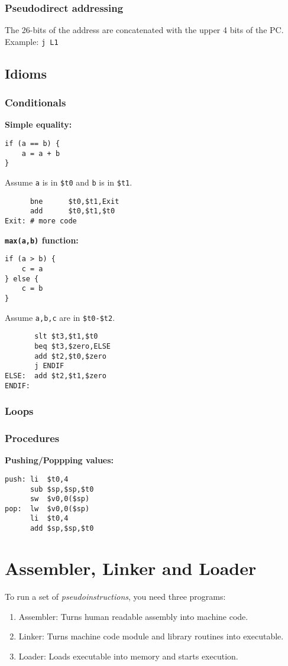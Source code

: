 \documentclass{article}
\theoremstyle{sltheorem}
\newcommand*\B[1]{\textbf{#1}}
\newcommand*\T[1]{\texttt{#1}}
\begin{document}
\subsubsection{Pseudodirect addressing}
The 26-bits of the address are concatenated with the upper 4 bits of the PC.\\
Example: \T{j L1}
\subsection{Idioms}
\subsubsection{Conditionals}
\B{Simple equality:}
\begin{verbatim}
if (a == b) {
	a = a + b
}
\end{verbatim}
Assume \T{a} is in \T{\$t0} and \T{b} is in \T{\$t1}.
\begin{verbatim}
      bne      $t0,$t1,Exit
      add      $t0,$t1,$t0
Exit: # more code
\end{verbatim}
\B{\T{max(a,b)} function:}
\begin{verbatim}
if (a > b) {
	c = a
} else {
	c = b
}
\end{verbatim}
Assume \T{a,b,c} are in \T{\$t0-\$t2}.
\begin{verbatim}
       slt $t3,$t1,$t0
       beq $t3,$zero,ELSE
       add $t2,$t0,$zero
       j ENDIF
ELSE:  add $t2,$t1,$zero
ENDIF: 
\end{verbatim}
\subsubsection{Loops}
\subsubsection{Procedures}
\B{Pushing/Poppping values:}
\begin{verbatim}
push: li  $t0,4
      sub $sp,$sp,$t0
      sw  $v0,0($sp)
pop:  lw  $v0,0($sp)
      li  $t0,4
      add $sp,$sp,$t0
\end{verbatim}
\section{Assembler, Linker and Loader}
To run a set of \emph{pseudoinstructions}, you need three programs:
\begin{enumerate}
	\item Assembler: Turns human readable assembly into machine code.
	\item Linker: Turns machine code module and library routines into executable.
	\item Loader: Loads executable into memory and starts execution.
\end{enumerate}
\end{document}

